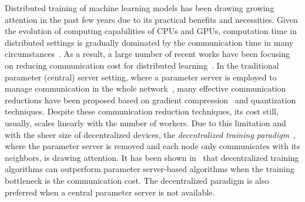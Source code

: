 \documentclass[11pt]{article}
\begin{document}
Distributed training of machine learning models has been drawing growing attention in the past few years due to its practical benefits and necessities. 
Given the evolution of computing capabilities of CPUs and GPUs, computation time in distributed settings is gradually dominated by the communication time in many circumstances~\citep{chilimbi2014project, mcmahan2017communication}. 
As a result, a large number of recent works have been focusing on reducing communication cost for distributed learning~\citep{alistarh2017qsgd,lin2017deep,wangni2018gradient,stich2018sparsified,wang2018atomo,tang2019doublesqueeze}. 
In the traditional parameter (central) server setting, where a parameter server is employed to manage communication in the whole network~\citep{Proc:Zhao_MLSys20}, many effective communication reductions have been proposed based on gradient compression~\citep{aji2017sparse} and quantization~\citep{chen2010approximate,jegou2010product,ge2013optimized,Proc:Xu_SIGMOD21} techniques. 
Despite these communication reduction techniques, its cost still, usually, scales linearly with the number of workers. 
Due to this limitation and with the sheer size of decentralized devices, the \emph{decentralized training paradigm}~\citep{duchi2011dual}, where the parameter server is removed and each node only communicates with its neighbors, is drawing attention. 
It has been shown in~\cite{lian2017can} that decentralized training algorithms can outperform parameter server-based algorithms when the training bottleneck is the communication cost. 
The decentralized paradigm is also preferred when a central parameter server is not available. 
\end{document}
